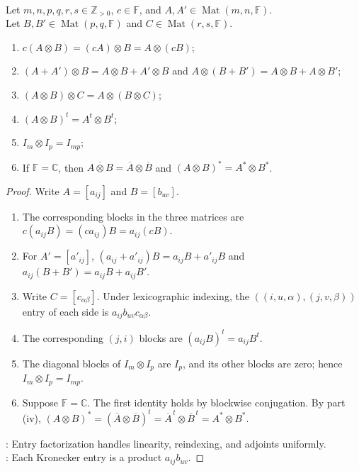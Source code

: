 \begin{proposition} \label{prop:basic-kronecker-identities} \\
Let $m,n,p,q,r,s\in\mathbb{Z}_{>0}$, $c\in\mathbb{F}$, and $A,A'\in\operatorname{Mat}(m,n,\mathbb{F})$.\\
Let $B,B'\in\operatorname{Mat}(p,q,\mathbb{F})$ and $C\in\operatorname{Mat}(r,s,\mathbb{F})$.
\begin{enumerate}[label=(\roman*)]
\setlength{\itemsep}{0pt}
\item $c(A\otimes B)=(cA)\otimes B=A\otimes(cB)$;
\item $(A+A')\otimes B=A\otimes B+A'\otimes B$ and $A\otimes(B+B')=A\otimes B+A\otimes B'$;
\item $(A\otimes B)\otimes C=A\otimes(B\otimes C)$;
\item $(A\otimes B)^t=A^t\otimes B^t$;
\item $I_m\otimes I_p=I_{mp}$;
\item If $\mathbb{F}=\mathbb{C}$, then $\overline{A\otimes B}=\overline{A}\otimes\overline{B}$ and $(A\otimes B)^*=A^*\otimes B^*$.
\end{enumerate}
\begin{proof}
Write $A=[a_{ij}]$ and $B=[b_{uv}]$.
\begin{enumerate}[label=(\roman*)]
\setlength{\itemsep}{0pt}
\item The corresponding blocks in the three matrices are $c(a_{ij}B)=(ca_{ij})B=a_{ij}(cB)$.
\item For $A'=[a'_{ij}]$, $(a_{ij}+a'_{ij})B=a_{ij}B+a'_{ij}B$ and $a_{ij}(B+B')=a_{ij}B+a_{ij}B'$.
\item Write $C=[c_{\alpha\beta}]$. Under lexicographic indexing, the $((i,u,\alpha),(j,v,\beta))$ entry of each side is $a_{ij}b_{uv}c_{\alpha\beta}$.
\item The corresponding $(j,i)$ blocks are $(a_{ij}B)^t=a_{ij}B^t$.
\item The diagonal blocks of $I_m\otimes I_p$ are $I_p$, and its other blocks are zero; hence $I_m\otimes I_p=I_{mp}$.
\item Suppose $\mathbb{F}=\mathbb{C}$. The first identity holds by blockwise conjugation. By part (iv), $(A\otimes B)^*=(\overline{A}\otimes\overline{B})^t=\overline{A}^{\,t}\otimes\overline{B}^{\,t}=A^*\otimes B^*$.
\end{enumerate}
: Entry factorization handles linearity, reindexing, and adjoints uniformly.\\
: Each Kronecker entry is a product $a_{ij}b_{uv}$.
\end{proof}
\end{proposition}

